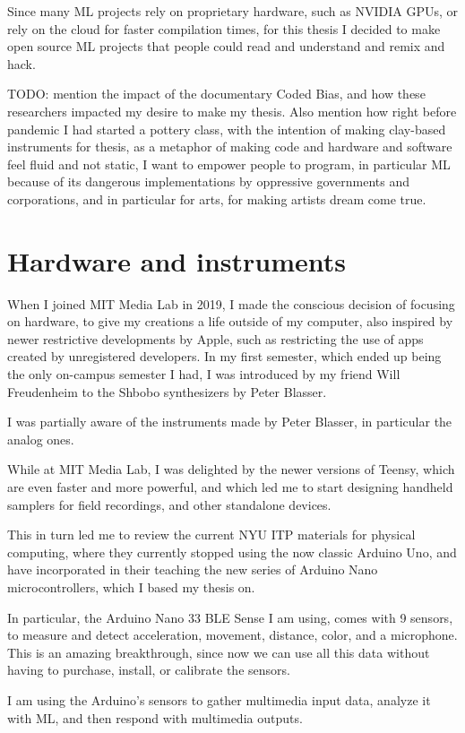 Since many \acrshort{ML} projects rely on proprietary hardware, such as NVIDIA GPUs, or rely on the cloud for faster compilation times, for this thesis I decided to make open source \acrshort{ML} projects that people could read and understand and remix and hack.

TODO: mention the impact of the documentary Coded Bias, and how these researchers impacted my desire to make my thesis. Also mention how right before pandemic I had started a pottery class, with the intention of making clay-based instruments for thesis, as a metaphor of making code and hardware and software feel fluid and not static, I want to empower people to program, in particular \acrshort{ML} because of its dangerous implementations by oppressive governments and corporations, and in particular for arts, for making artists dream come true.

\section{Hardware and instruments}



When I joined MIT Media Lab in 2019, I made the conscious decision of focusing on hardware, to give my creations a life outside of my computer, also inspired by newer restrictive developments by Apple, such as restricting the use of apps created by unregistered developers. In my first semester, which ended up being the only on-campus semester I had, I was introduced by my friend Will Freudenheim to the Shbobo synthesizers by Peter Blasser.


I was partially aware of the instruments made by Peter Blasser, in particular the analog ones.

While at MIT Media Lab, I was delighted by the newer versions of Teensy, which are even faster and more powerful, and which led me to start designing handheld samplers for field recordings, and other standalone devices.

This in turn led me to review the current \acrshort{NYU} \acrshort{ITP} materials for physical computing, where they currently stopped using the now classic Arduino Uno, and have incorporated in their teaching the new series of Arduino Nano microcontrollers, which I based my thesis on.

In particular, the Arduino Nano 33 \acrshort{BLE} Sense I am using, comes with 9 sensors, to measure and detect acceleration, movement, distance, color, and a microphone. This is an amazing breakthrough, since now we can use all this data without having to purchase, install, or calibrate the sensors.

I am using the Arduino's sensors to gather multimedia input data, analyze it with \acrshort{ML}, and then respond with multimedia outputs.
